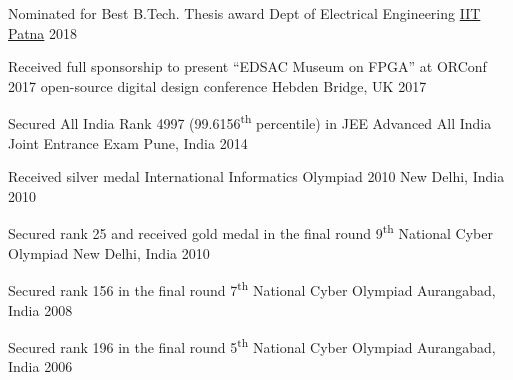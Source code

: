 
\begin{cvhonors}

\cvhonor
	{Nominated for Best B.Tech. Thesis award} %
	{Dept of Electrical Engineering} %
	{\href{https://www.iitp.ac.in}{IIT Patna}} %
	{2018} %

\cvhonor
	{Received full sponsorship to present ``EDSAC Museum on FPGA'' at ORConf 2017 open-source digital design conference} %
	{} %
	{Hebden Bridge, UK} %
	{2017} %

\cvhonor
	{Secured All India Rank 4997 (99.6156\textsuperscript{th} percentile) in JEE Advanced} %
	{All India Joint Entrance Exam} %
	{Pune, India} %
	{2014} %

\cvhonor
	{Received silver medal} %
	{International Informatics Olympiad 2010} %
	{New Delhi, India} %
	{2010} %

\cvhonor
	{Secured rank 25 and received gold medal in the final round} %
	{9\textsuperscript{th} National Cyber Olympiad} %
	{New Delhi, India} %
	{2010} %

\cvhonor
	{Secured rank 156 in the final round} %
	{7\textsuperscript{th} National Cyber Olympiad} %
	{Aurangabad, India} %
	{2008} %

\cvhonor
	{Secured rank 196 in the final round} %
	{5\textsuperscript{th} National Cyber Olympiad} %
	{Aurangabad, India} %
	{2006} %

\end{cvhonors}
